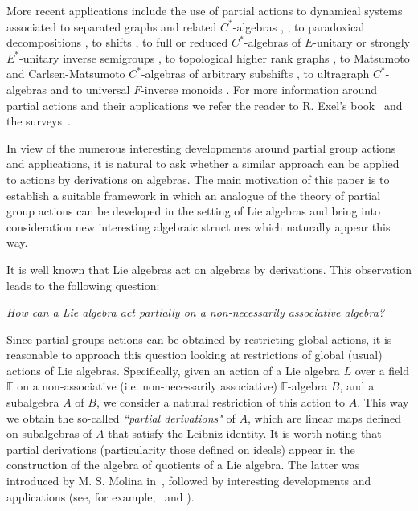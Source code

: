\documentclass{amsart}
\newcommand{\F}{\mathbb{F}}
\newcommand{\0}{{\vartheta}}
\theoremstyle{definition}
\theoremstyle{remark}
\numberwithin{equation}{section}
\newtheorem*{Theorem A}{\textbf{Theorem A}}
\newtheorem*{Corollary E}{\textbf{Corollary E}}
\newtheorem*{Corollary F}{\textbf{Corollary F}}
\newtheorem*{Theorem B}{\textbf{Theorem B}}
\newtheorem*{Theorem C}{\textbf{Theorem C}}
\newtheorem*{Theorem D}{\textbf{Theorem B}}
\newtheorem*{p a}{\textbf{Proof of  Theorem A}}
\newtheorem*{p b}{\textbf{Proof of Theorem B}}
\newtheorem*{p c}{\textbf{Proof of  Theorem C}}
\newtheorem*{p d}{\textbf{Proof of  Theorem D}}
\begin{document}
  More  recent applications include the use of partial actions    to dynamical systems associated to separated graphs and related $C^*$-algebras   \cite{AraE1}, \cite{AraL},  to paradoxical decompositions \cite{AraE1}, to shifts  \cite{AraL}, to full or reduced $C^*$-algebras  of $E$-unitary or strongly $E^*$-unitary inverse semigroups  \cite{MiSt}, 
to  topological higher rank graphs \cite{RenWil}, to Matsumoto and Carlsen-Matsumoto $C^*$-algebras of arbitrary subshifts    \cite{DE2},   to ultragraph $C^*$-algebras \cite{GR3} and to universal $F$-inverse monoids \cite{KudFur}.
 For more information around partial actions and their
applications we refer the reader to R. Exel’s book~\cite{ExelBook} and the surveys~\cite{Ba,dokuchaev2011,dokuchaev2019}.


In view of the numerous interesting developments around partial group actions and applications, it is natural to ask whether a similar approach can be applied to actions by derivations on algebras. The main motivation of this paper is to establish a suitable framework in which an analogue of the theory of partial group actions can be developed in the setting of Lie algebras  and bring into consideration new interesting algebraic structures which naturally appear this way. 


It is well known that Lie algebras act  on  algebras by derivations. This observation leads to the following  question:

\begin{center}
\emph{How can a Lie algebra act partially on a  non-necessarily associative algebra?}\\
\end{center}


 Since partial groups actions can be obtained by restricting global actions, it is reasonable to  approach this question looking  at restrictions of global (usual) actions of Lie algebras. Specifically, given an action of a Lie algebra $L$ over a field $\F$ on a  non-associative (i.e. non-necessarily associative)  $\F$-algebra $B$, and a subalgebra $A$ of $B$, we consider a natural restriction of this action to $A$. This way  we obtain the so-called {\em ``partial derivations"} of $A$, which are linear maps defined on subalgebras of $A$ that satisfy the Leibniz identity. It is worth noting that partial derivations (particularity those defined on ideals) appear in the construction of the algebra of quotients of a Lie algebra. The latter was introduced  by M. S. Molina in~\cite{Molina2004}, followed by   interesting developments and applications (see, for example,~\cite{BresarPereraOrtegaMolina} and \cite{OrtegaMolina}).
\end{document}
